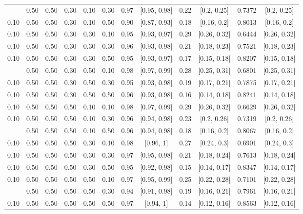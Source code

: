 \documentclass[
  11pt,
]{article}
\begin{document}
\begin{landscape}
\begin{ThreePartTable}
\begin{longtable}[t]{cccccccccccc}
\addlinespace
0.10 & 0.50 & 0.50 & 0.30 & 0.10 & 0.30 & 0.97 & {}[0.95, 0.98] & 0.22 & {}[0.2, 0.25] & 0.7372 & {}[0.2, 0.25]\\
0.10 & 0.50 & 0.50 & 0.30 & 0.10 & 0.50 & 0.90 & {}[0.87, 0.93] & 0.18 & {}[0.16, 0.2] & 0.8013 & {}[0.16, 0.2]\\
0.10 & 0.50 & 0.50 & 0.30 & 0.30 & 0.10 & 0.95 & {}[0.93, 0.97] & 0.29 & {}[0.26, 0.32] & 0.6444 & {}[0.26, 0.32]\\
0.10 & 0.50 & 0.50 & 0.30 & 0.30 & 0.30 & 0.96 & {}[0.93, 0.98] & 0.21 & {}[0.18, 0.23] & 0.7521 & {}[0.18, 0.23]\\
0.10 & 0.50 & 0.50 & 0.30 & 0.30 & 0.50 & 0.95 & {}[0.93, 0.97] & 0.17 & {}[0.15, 0.18] & 0.8207 & {}[0.15, 0.18]\\
\addlinespace
0.10 & 0.50 & 0.50 & 0.30 & 0.50 & 0.10 & 0.98 & {}[0.97, 0.99] & 0.28 & {}[0.25, 0.31] & 0.6801 & {}[0.25, 0.31]\\
0.10 & 0.50 & 0.50 & 0.30 & 0.50 & 0.30 & 0.95 & {}[0.93, 0.98] & 0.19 & {}[0.17, 0.21] & 0.7875 & {}[0.17, 0.21]\\
0.10 & 0.50 & 0.50 & 0.30 & 0.50 & 0.50 & 0.96 & {}[0.93, 0.98] & 0.16 & {}[0.14, 0.18] & 0.8241 & {}[0.14, 0.18]\\
0.10 & 0.50 & 0.50 & 0.50 & 0.10 & 0.10 & 0.98 & {}[0.97, 0.99] & 0.29 & {}[0.26, 0.32] & 0.6629 & {}[0.26, 0.32]\\
0.10 & 0.50 & 0.50 & 0.50 & 0.10 & 0.30 & 0.96 & {}[0.94, 0.98] & 0.23 & {}[0.2, 0.26] & 0.7319 & {}[0.2, 0.26]\\
\addlinespace
0.10 & 0.50 & 0.50 & 0.50 & 0.10 & 0.50 & 0.96 & {}[0.94, 0.98] & 0.18 & {}[0.16, 0.2] & 0.8067 & {}[0.16, 0.2]\\
0.10 & 0.50 & 0.50 & 0.50 & 0.30 & 0.10 & 0.98 & {}[0.96, 1] & 0.27 & {}[0.24, 0.3] & 0.6901 & {}[0.24, 0.3]\\
0.10 & 0.50 & 0.50 & 0.50 & 0.30 & 0.30 & 0.97 & {}[0.95, 0.98] & 0.21 & {}[0.18, 0.24] & 0.7613 & {}[0.18, 0.24]\\
0.10 & 0.50 & 0.50 & 0.50 & 0.30 & 0.50 & 0.95 & {}[0.92, 0.98] & 0.15 & {}[0.14, 0.17] & 0.8347 & {}[0.14, 0.17]\\
0.10 & 0.50 & 0.50 & 0.50 & 0.50 & 0.10 & 0.97 & {}[0.95, 0.99] & 0.25 & {}[0.22, 0.28] & 0.7101 & {}[0.22, 0.28]\\
\addlinespace
0.10 & 0.50 & 0.50 & 0.50 & 0.50 & 0.30 & 0.94 & {}[0.91, 0.98] & 0.19 & {}[0.16, 0.21] & 0.7961 & {}[0.16, 0.21]\\
0.10 & 0.50 & 0.50 & 0.50 & 0.50 & 0.50 & 0.97 & {}[0.94, 1] & 0.14 & {}[0.12, 0.16] & 0.8563 & {}[0.12, 0.16]\\

\end{longtable}
\end{ThreePartTable}
\end{landscape}
\end{document}
